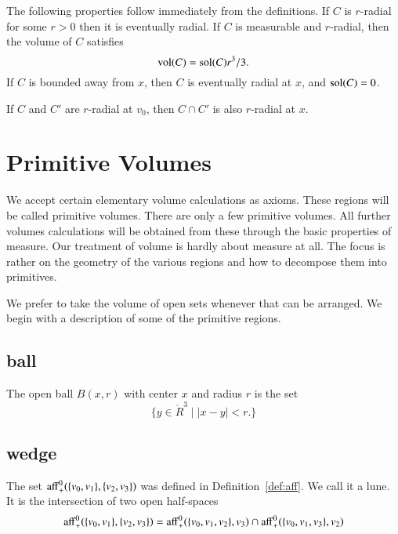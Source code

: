 The following properties follow immediately from the definitions.
If $C$ is $r$-radial for some $r>0$ then it is eventually radial.
If $C$ is measurable and $r$-radial, then the volume of $C$
satisfies
    $$
    {\operatorname{vol}}(C) = {\operatorname{sol}}(C) r^3/3.
    $$
If $C$ is bounded away from $x$, then $C$ is eventually radial at
$x$, and ${\operatorname{sol}}(C) = 0$.

\begin{lemma}  If $C$ and $C'$ are  $r$-radial
at $v_0$, then $C\cap C'$ is also $r$-radial at
$x$.
\end{lemma}






\section{Primitive Volumes}

We accept 
certain elementary volume calculations as axioms.  
These regions will be called primitive volumes.  There are only
a few primitive volumes.
All further
volumes calculations will be obtained from these through the basic
properties of measure.   
Our treatment of volume 
is hardly about measure at all.  The focus is rather on
the geometry of the various regions and how to decompose them into
primitives.

We prefer to take the volume of open sets whenever that can be
arranged.  We begin with a description of some of the primitive
regions.






\subsection{ball}

\begin{definition}  The open ball $B(x,r)$ with center $x$ and
radius $r$ is the set
    $$
    \{ y\in\ring{R}^3 \mid |x-y| < r.\}
    $$
\end{definition}



\subsection{wedge}


The set ${\operatorname{aff}}^0_+(\{v_0,v_1\},\{v_2,v_3\})$ was defined
in Definition~\ref{def:aff}.  We call it a lune.  It is the intersection
of two open half-spaces
    $$
    {\operatorname{aff}}^0_+(\{v_0,v_1\},\{v_2,v_3\})
    ={\operatorname{aff}}^0_+(\{v_0,v_1,v_2\},v_3)\cap
    {\operatorname{aff}}^0_+(\{v_0,v_1,v_3\},v_2)
    $$


